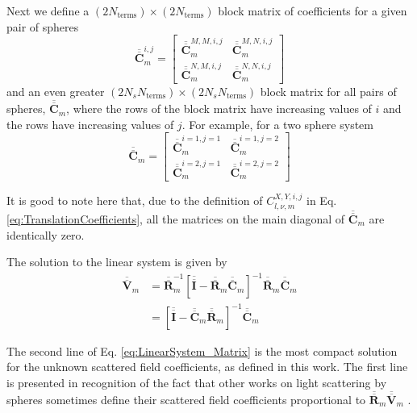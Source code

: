 Next we define a $(2 N_{\mathrm{terms}}) \times (2 N_{\mathrm{terms}})$ block matrix of coefficients for a given pair of spheres
\begin{equation}
\overline{\overline{\boldsymbol{C}}}_{m}^{i,j} = \left[ \begin{array}{c|c}
\overline{\overline{\boldsymbol{C}}}_{m}^{M,M,i,j} & \overline{\overline{\boldsymbol{C}}}_{m}^{M,N,i,j} \\ \hline
\overline{\overline{\boldsymbol{C}}}_{m}^{N,M,i,j} & \overline{\overline{\boldsymbol{C}}}_{m}^{N,N,i,j}
\end{array}\right]
\end{equation}
%
and an even greater $(2 N_{s} N_{\mathrm{terms}}) \times (2 N_{s} N_{\mathrm{terms}})$ block matrix for all pairs of spheres, $\overline{\overline{\boldsymbol{C}}}_{m}$, where the rows of the block matrix have increasing values of $i$ and the rows have increasing values of $j$. For example, for a two sphere system
\begin{equation}
\overline{\overline{\boldsymbol{C}}}_{m} = \left[ \begin{array}{c|c}
\overline{\overline{\boldsymbol{C}}}_{m}^{i=1,j=1} & \overline{\overline{\boldsymbol{C}}}_{m}^{i=1,j=2} \\ \hline
\overline{\overline{\boldsymbol{C}}}_{m}^{i=2,j=1} & \overline{\overline{\boldsymbol{C}}}_{m}^{i=2,j=2}
\end{array}\right]
\end{equation}

It is good to note here that, due to the definition of $C_{l, \nu, m}^{X,Y,i,j}$ in Eq. \ref{eq:TranslationCoefficients}, all the matrices on the main diagonal of $\overline{\overline{\boldsymbol{C}}}_{m}$ are identically zero.

The solution to the  linear system is given by
\begin{equation}\label{eq:LinearSystem_Matrix}
\begin{split}
\overline{\overline{\boldsymbol{V}}}_{m} &= \overline{\overline{\boldsymbol{R}}}_{m}^{-1} \left[ \overline{\overline{\boldsymbol{I}}} - \overline{\overline{\boldsymbol{R}}}_{m} \overline{\overline{\boldsymbol{C}}}_{m} \right]^{-1} \overline{\overline{\boldsymbol{R}}}_{m} \overline{\overline{\boldsymbol{C}}}_{m}
\\
&= \left[ \overline{\overline{\boldsymbol{I}}} - \overline{\overline{\boldsymbol{C}}}_{m} \overline{\overline{\boldsymbol{R}}}_{m} \right]^{-1} \overline{\overline{\boldsymbol{C}}}_{m}
\end{split}
\end{equation}

The second line of Eq. \ref{eq:LinearSystem_Matrix} is the most compact solution for the unknown scattered field coefficients, as defined in this work. The first line is presented in recognition of the fact that other works on light scattering by spheres sometimes define their scattered field coefficients proportional to $\overline{\overline{\boldsymbol{R}}}_{m} \overline{\overline{\boldsymbol{V}}}_{m}$ \cite{Narayanaswamy2008, Mackowski2008}.